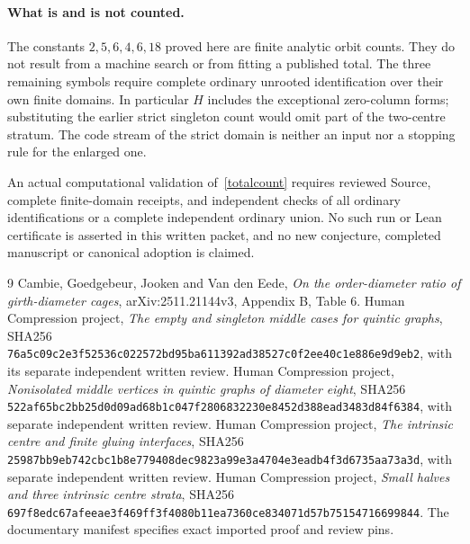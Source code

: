\documentclass[11pt]{article}
\begin{document}
\paragraph{What is and is not counted.}
The constants $2,5,6,4,6,18$ proved here are finite analytic orbit counts.
They do not result from a machine search or from fitting a published
total. The three remaining symbols require complete ordinary unrooted
identification over their own finite domains. In particular $H$ includes
the exceptional zero-column forms; substituting the earlier strict
singleton count would omit part of the two-centre stratum. The code
stream of the strict domain is neither an input nor a stopping rule for
the enlarged one.

An actual computational validation of~\eqref{totalcount} requires reviewed
Source, complete finite-domain receipts, and independent checks of all
ordinary identifications or a complete independent ordinary union. No
such run or Lean certificate is asserted in this written packet, and
no new conjecture, completed manuscript or canonical adoption is claimed.

\begin{thebibliography}{9}
 Cambie, Goedgebeur, Jooken and Van den Eede,
\emph{On the order-diameter ratio of girth-diameter cages},
arXiv:2511.21144v3, Appendix B, Table 6.
 Human Compression project,
\emph{The empty and singleton middle cases for quintic graphs},
SHA256
\texttt{76a5c09c2e3f52536c022572bd95ba611392ad38527c0f2ee40c1e886e9d9eb2},
with its separate independent written review.
 Human Compression project,
\emph{Nonisolated middle vertices in quintic graphs of diameter eight},
SHA256
\texttt{522af65bc2bb25d0d09ad68b1c047f2806832230e8452d388ead3483d84f6384},
with separate independent written review.
 Human Compression project,
\emph{The intrinsic centre and finite gluing interfaces}, SHA256
\texttt{25987bb9eb742cbc1b8e779408dec9823a99e3a4704e3eadb4f3d6735aa73a3d},
with separate independent written review.
 Human Compression project,
\emph{Small halves and three intrinsic centre strata}, SHA256
\texttt{697f8edc67afeeae3f469ff3f4080b11ea7360ce834071d57b75154716699844}.
The documentary manifest specifies exact imported proof and review pins.
\end{thebibliography}
\end{document}
